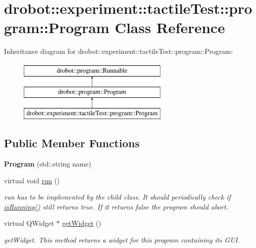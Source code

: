 \hypertarget{classdrobot_1_1experiment_1_1tactileTest_1_1program_1_1Program}{\section{drobot\-:\-:experiment\-:\-:tactile\-Test\-:\-:program\-:\-:Program Class Reference}
\label{classdrobot_1_1experiment_1_1tactileTest_1_1program_1_1Program}
}
Inheritance diagram for drobot\-:\-:experiment\-:\-:tactile\-Test\-:\-:program\-:\-:Program\-:\begin{figure}[H]
\begin{center}
\leavevmode
\includegraphics[height=3.000000cm]{classdrobot_1_1experiment_1_1tactileTest_1_1program_1_1Program}
\end{center}
\end{figure}
\subsection*{Public Member Functions}
\begin{DoxyCompactItemize}
\item 
\hypertarget{classdrobot_1_1experiment_1_1tactileTest_1_1program_1_1Program_aa5f0d003909831299df4b658a15c9b22}{{\bfseries Program} (std\-::string name)}\label{classdrobot_1_1experiment_1_1tactileTest_1_1program_1_1Program_aa5f0d003909831299df4b658a15c9b22}

\item 
\hypertarget{classdrobot_1_1experiment_1_1tactileTest_1_1program_1_1Program_a6b9cfdd2d5bb66558836f8c404cfc701}{virtual void \hyperlink{classdrobot_1_1experiment_1_1tactileTest_1_1program_1_1Program_a6b9cfdd2d5bb66558836f8c404cfc701}{run} ()}\label{classdrobot_1_1experiment_1_1tactileTest_1_1program_1_1Program_a6b9cfdd2d5bb66558836f8c404cfc701}

\begin{DoxyCompactList}\small\item\em run has to be implemented by the child class. It should periodically check if \hyperlink{classdrobot_1_1program_1_1Runnable_ab22aef578839f56051702094b6f768df}{is\-Running()} still returns true. If it returns false the program should abort. \end{DoxyCompactList}\item 
virtual Q\-Widget $\ast$ \hyperlink{classdrobot_1_1experiment_1_1tactileTest_1_1program_1_1Program_a63c70e8e24bfc651d3be41680590303d}{get\-Widget} ()
\begin{DoxyCompactList}\small\item\em get\-Widget. This method returns a widget for this program containing its G\-U\-I. \end{DoxyCompactList}\end{DoxyCompactItemize}
